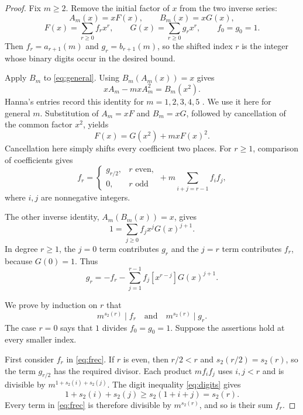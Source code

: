 \documentclass[11pt,a4paper]{article}
\theoremstyle{remark}\newtheorem{remark}[theorem]{Remark}
\begin{document}
\begin{proof}
Fix $m\ge2$. Remove the initial factor of $x$ from the two inverse series:
\[
 A_m(x)=xF(x),\qquad B_m(x)=xG(x),
\]
\[
 F(x)=\sum_{r\ge0}f_rx^r,\qquad
 G(x)=\sum_{r\ge0}g_rx^r,\qquad f_0=g_0=1.
\]
Then $f_r=a_{r+1}(m)$ and $g_r=b_{r+1}(m)$, so the shifted index $r$
is the integer whose binary digits occur in the desired bound.

Apply $B_m$ to \eqref{eq:general}. Using $B_m(A_m(x))=x$ gives
\[
 xA_m-mxA_m^2=B_m(x^2).
\]
Hanna's entries record this identity for $m=1,2,3,4,5$
\cite{oeis1,oeis2,oeis3,oeis4,oeis5}. We use it here for general $m$.
Substitution of $A_m=xF$ and $B_m=xG$, followed by cancellation of the
common factor $x^2$, yields
\begin{equation}\label{eq:FG}
 F(x)=G(x^2)+mxF(x)^2.
\end{equation}
Cancellation here simply shifts every coefficient two places. For $r\ge1$,
comparison of coefficients gives
\begin{equation}\label{eq:frec}
 f_r=\begin{cases}g_{r/2},&r\text{ even},\\0,&r\text{ odd}\end{cases}
       +m\sum_{i+j=r-1}f_if_j,
\end{equation}
where $i,j$ are nonnegative integers.

The other inverse identity, $A_m(B_m(x))=x$, gives
\[
 1=\sum_{j\ge0}f_jx^jG(x)^{j+1}.
\]
In degree $r\ge1$, the $j=0$ term contributes $g_r$ and the $j=r$
term contributes $f_r$, because $G(0)=1$. Thus
\begin{equation}\label{eq:grec}
 g_r=-f_r-\sum_{j=1}^{r-1}f_j[x^{r-j}]G(x)^{j+1}.
\end{equation}

We prove by induction on $r$ that
\begin{equation}\label{eq:simultaneous}
 m^{s_2(r)}\mid f_r\quad\text{and}\quad m^{s_2(r)}\mid g_r.
\end{equation}
The case $r=0$ says that $1$ divides $f_0=g_0=1$.
Suppose the assertions hold at every smaller index.

First consider $f_r$ in \eqref{eq:frec}. If $r$ is even, then
$r/2<r$ and $s_2(r/2)=s_2(r)$, so the term $g_{r/2}$ has the required
divisor. Each product $mf_if_j$ uses $i,j<r$ and is divisible by
$m^{1+s_2(i)+s_2(j)}$. The digit inequality \eqref{eq:digits} gives
\[
 1+s_2(i)+s_2(j)\ge s_2(1+i+j)=s_2(r).
\]
Every term in \eqref{eq:frec} is therefore divisible by $m^{s_2(r)}$,
and so is their sum $f_r$.


\end{proof}
\end{document}
